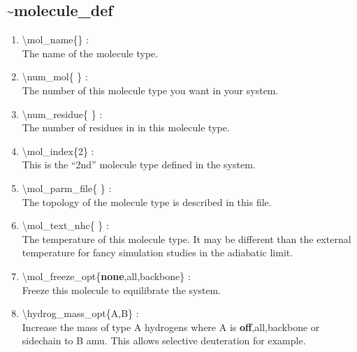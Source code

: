 \documentclass[12pt,titlepage]{article}
\begin{document}

\newpage
\subsection*{\bf \~{}molecule\_def}

\begin{enumerate}

 \vspace{0.15in} 
 \item  \textbackslash mol\_name\{\} : \\
   The name of the molecule type.

 \vspace{0.15in} 
 \item  \textbackslash num\_mol\{ \} : \\ 
   The number of this molecule type you want in your system.

 \vspace{0.15in} 
 \item  \textbackslash num\_residue\{ \} : \\
   The number of residues in in this molecule type.

 \vspace{0.15in} 
 \item  \textbackslash mol\_index\{2\} : \\ 
   This is the ``2nd'' molecule type defined in the system.

 \vspace{0.15in} 
 \item  \textbackslash mol\_parm\_file\{ \} : \\
   The topology of the molecule type is described in this file.

 \vspace{0.15in} 
 \item  \textbackslash mol\_text\_nhc\{ \} : \\
   The temperature of this molecule type. It may be different than the
   external temperature for fancy simulation studies in the adiabatic limit.

 \vspace{0.15in} 
 \item  \textbackslash mol\_freeze\_opt\{{\bf none},all,backbone\} : \\
    Freeze this molecule to equilibrate the system.

 \vspace{0.15in} 
 \item  \textbackslash hydrog\_mass\_opt\{A,B\} : \\
   Increase the mass of type A hydrogens where A is 
   {\bf off},all,backbone or sidechain to B amu. This allows
   selective deuteration for example.


\end{enumerate}
\end{document}
